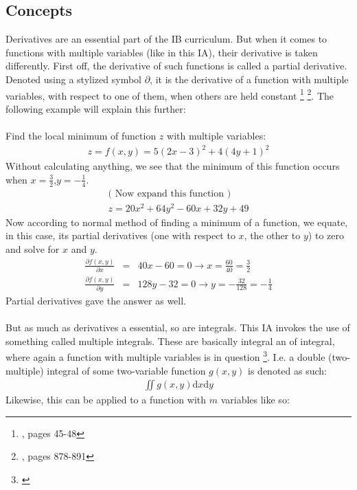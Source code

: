 \subsection{Concepts}
Derivatives are an essential part of the IB curriculum. But when it comes to functions with multiple variables (like in this IA), their derivative is taken differently. First off, the derivative of such functions is called a partial derivative. Denoted using a stylized symbol $\partial$, it is the derivative of a function with multiple variables, with respect to one of them, when others are held constant \footnote{\cite{matthews_1998}, pages 45-48} \footnote{\cite{stewart_2008_deriv}, pages 878-891}. The following example will explain this further:\\
\\
Find the local minimum of function $z$ with multiple variables:
\begin{gather*}
z = f(x,y) = 5(2x-3)^{2} + 4(4y+1)^{2}
\end{gather*}
Without calculating anything, we see that the minimum of this function occurs when $x= \frac{3}{2} $,$ y= -\frac{1}{4}$.
\begin{gather*}
\text{( Now expand this function )}\\
z = 20x^{2} + 64y^{2} -60x + 32y +49
\end{gather*}
Now according to normal method of finding a minimum of a function, we equate, in this case, its partial derivatives (one with respect to $x$, the other to $y$) to zero and solve for $x$ and $y$.
\begin{eqnarray*}
\frac{\partial f(x,y)}{\partial x}  &=&  40x-60 = 0 \rightarrow x = \frac{60}{40}=\frac{3}{2}\\
\frac{\partial f(x,y)}{\partial y}  &=&  128y-32 = 0 \rightarrow y = -\frac{32}{128}=-\frac{1}{4}
\end{eqnarray*}
Partial derivatives gave the answer as well.\\
\\
But as much as derivatives a essential, so are integrals. This IA invokes the use of something called multiple integrals. These are basically integral an of integral, where again a function with multiple variables is in question \footnote{\cite{stewart_2008_int}}. I.e. a double (two-multiple) integral of some two-variable function $g(x,y)$ is denoted as such:
\begin{gather*}
\iint g(x,y) \mathrm{d}x\mathrm{d}y
\end{gather*}
Likewise, this can be applied to a function with $m$ variables like so:
